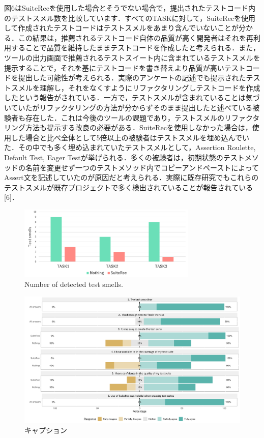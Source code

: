 \documentclass[conference]{IEEEtran}
\begin{document}
図6はSuiteRecを使用した場合とそうでない場合で，提出されたテストコード内のテストスメル数を比較しています．すべてのTASKに対して，SuiteRecを使用して作成されたテストコードはテストスメルをあまり含んでいないことが分かる．この結果は，推薦されるテストコード自体の品質が高く開発者はそれを再利用することで品質を維持したままテストコードを作成したと考えられる．また，ツールの出力画面で推薦されるテストスイート内に含まれているテストスメルを提示することで，それを基にテストコードを書き替えより品質が高いテストコードを提出した可能性が考えられる．実際のアンケートの記述でも提示されたテストスメルを理解し，それをなくすようにリファクタリングしテストコードを作成したという報告がされている．一方で，テストスメルが含まれていることは気づいていたがリファクタリングの方法が分からずそのまま提出したと述べている被験者も存在した．これは今後のツールの課題であり，テストスメルのリファクタリング方法も提示する改良の必要がある．SuiteRecを使用しなかった場合は，使用した場合と比べ全体として5倍以上の被験者はテストスメルを埋め込んでいた．その中でも多く埋め込まれていたテストスメルとして，Assertion Roulette, Default Test, Eager Testが挙げられる．多くの被験者は，初期状態のテストメソッドの名前を変更せず一つのテストメソッド内でコピーアンドペーストによってAssert文を記述していたのが原因だと考えられる．実際に既存研究でもこれらのテストスメルが既存プロジェクトで多く検出されていることが報告されている[6]． 

\begin{figure}[htbp]
\centerline{\includegraphics[width=8.5cm]{smells.pdf}}
\caption{Number of detected test smells.}
\label{fig7}
\end{figure}

\begin{figure}[t]
 \begin{center}
  \includegraphics[width=18.5cm]{suiterec-expt.pdf}
  \caption{キャプション}
  \label{}
 \end{center}
\end{figure}
\end{document}
